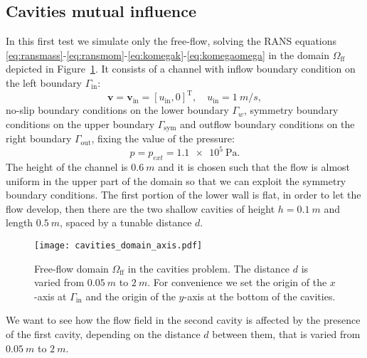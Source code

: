 \subsection{Cavities mutual influence}
In this first test we simulate only the free-flow, solving the RANS equations  \eqref{eq:ransmass}-\eqref{eq:ransmom}-\eqref{eq:komegak}-\eqref{eq:komegaomega} in the domain $\Omega_\text{ff}$ depicted in Figure~\ref{fig:singledomain}. It consists of a channel with inflow boundary 
condition on the left boundary $\Gamma_\text{in}$:
\begin{equation}
	\mathbf{v} = \mathbf{v}_\text{in} = [u_\text{in}, 0]^\mathrm{T}, \quad u_\text{in} = \SI{1}{m/s},
\end{equation}
no-slip boundary conditions on the lower boundary $\Gamma_w$, symmetry boundary conditions on the upper boundary $\Gamma_\text{sym}$ and outflow boundary conditions on the right boundary $\Gamma_\text{out}$, fixing the value of the pressure:
\begin{equation}
	p = p_{ext} = \SI{1.1e5}{\pascal}.
\end{equation}
The height of the channel is $\SI{0.6}{m}$ and it is chosen such that the flow is almost uniform in the upper part of the domain so that we can exploit the symmetry boundary conditions. The first portion of the lower wall is flat, in order to let the flow develop, then there are the two shallow cavities of height $h=\SI{0.1}{m}$ and length $\SI{0.5}{m}$, spaced by a tunable distance $d$.
\begin{figure}[ht]
	\centering
	\texttt{[image: cavities\_domain\_axis.pdf]}
	\caption[Free-flow domain $\Omega_\text{ff}$ in the cavities problem]{Free-flow domain $\Omega_\text{ff}$ in the cavities problem. The distance $d$ is varied from $\SI{0.05}{m}$ to $\SI{2}{m}$. For convenience we set the origin of the $x$-axis at $\Gamma_\text{in}$ and the origin of the $y$-axis at the bottom of the cavities.}
	\label{fig:singledomain}
\end{figure}

We want to see how the flow field in the second cavity is affected by the 
presence of the first cavity, depending on the distance $d$ between them, that 
is varied from $\SI{0.05}{m}$ to $\SI{2}{m}$.

